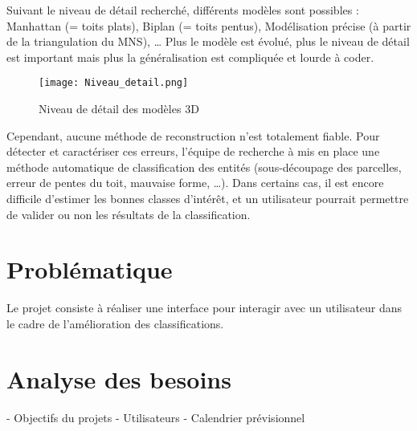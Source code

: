 Suivant le niveau de détail recherché, différents modèles sont possibles : Manhattan (= toits plats), Biplan (= toits pentus), Modélisation précise (à partir de la triangulation du MNS), … Plus le modèle est évolué, plus le niveau de détail est important mais plus la généralisation est compliquée et lourde à coder.\newline

\begin{figure}[!h]
	\begin{center}
		\texttt{[image: Niveau\_detail.png]}  \\
		\caption[Niveau de détail des modèles 3D]{Niveau de détail des modèles 3D}
		\label{fig:example}
	\end{center}
\end{figure}

\newpage Cependant, aucune méthode de reconstruction n’est totalement fiable. Pour détecter et caractériser ces erreurs, l’équipe de recherche à mis en place une méthode automatique de classification des entités (sous-découpage des parcelles, erreur de pentes du toit, mauvaise forme, …). Dans certains cas, il est encore difficile d’estimer les bonnes classes d’intérêt, et un utilisateur pourrait permettre de valider ou non les résultats de la classification. \newline 

\section{Problématique}

Le projet consiste à réaliser une interface pour interagir avec un utilisateur dans le cadre de l'amélioration des classifications. 

\section{Analyse des besoins}

- Objectifs du projets
- Utilisateurs
- Calendrier prévisionnel
